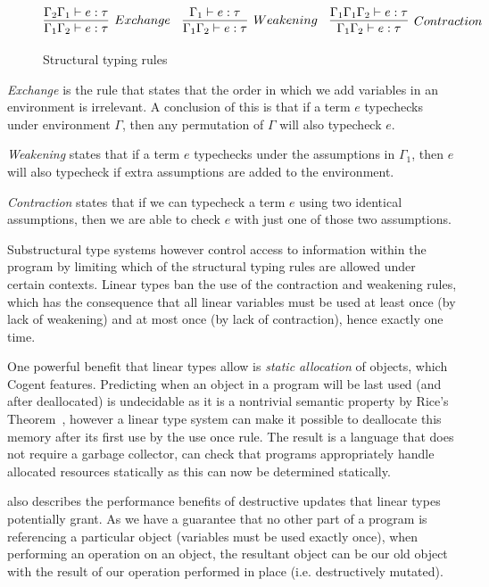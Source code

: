 \begin{figure}
    \centering
    $$
        \infer[Exchange]{
            \Gamma_1\Gamma_2 \vdash e : \tau
        }{
            \Gamma_2\Gamma_1 \vdash e : \tau
        }\quad
        \infer[Weakening]{
            \Gamma_1\Gamma_2 \vdash e : \tau
        }{
            \Gamma_1 \vdash e : \tau
        }\quad
        \infer[Contraction]{
            \Gamma_1\Gamma_2 \vdash e : \tau
        }{
            \Gamma_1\Gamma_1\Gamma_2 \vdash e : \tau
        }
    $$
    \caption{Structural typing rules}
    \label{def:structural}
\end{figure}

\textit{Exchange} is the rule that states that the order in which we add variables in an environment
is irrelevant. A conclusion of this is that if a term $e$ typechecks under environment $\Gamma$,
then any permutation of $\Gamma$ will also typecheck $e$.

\textit{Weakening} states that if a term $e$ typechecks under the assumptions
in $\Gamma_1$, then $e$ will also typecheck if extra assumptions are added to the environment.

\textit{Contraction} states that if we can typecheck a term $e$ using two identical
assumptions, then we are able to check $e$ with just one of those two assumptions.

Substructural type systems however control access to information within the program by limiting which
of the structural typing rules are allowed under certain contexts. Linear types ban the use of the
contraction and weakening rules, which has the consequence that all linear variables must be used 
at least once (by lack of weakening) and at most once (by lack of contraction), hence exactly one time.

One powerful benefit that linear types allow is \textit{static allocation} of objects, which Cogent
features. Predicting when an object in a program will be last used (and after deallocated)
is undecidable as it is a nontrivial semantic property by Rice's Theorem~\citep{Sipser},
however a linear type system can make it possible to deallocate this memory after its first use
by the use once rule. The result is a language that does not require a garbage collector,
can check that programs appropriately handle allocated resources statically as this can now
be determined statically.

\citet{LinearTypesChangeTheWorld} also describes the performance benefits of destructive updates
that linear types potentially grant. As we have a guarantee that no other part of a program is
referencing a particular object (variables must be used exactly once), when performing
an operation on an object, the resultant object can be our old object with the result
of our operation performed in place (i.e. destructively mutated).

